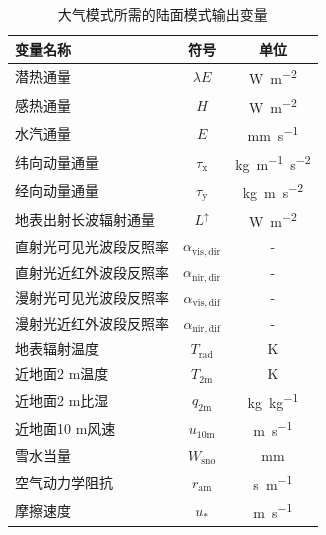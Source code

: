 {
  \begin{table}[htbp]
    \centering
    \caption{大气模式所需的陆面模式输出变量}
    \label{tab:大气模式所需的陆面模式输出变量}
    \begin{threeparttable}
      \begin{tabular}{lcc}
        \toprule
        变量名称               & 符号                        & 单位                     \\ \midrule
        潜热通量               & $\lambda E$                 & \unit{W.m^{-2}}          \\
        感热通量               & $H$                         & \unit{W.m^{-2}}          \\
        水汽通量               & $E$                         & \unit{mm.s^{-1}}         \\
        纬向动量通量           & $\tau_{\mathrm{x}}$         & \unit{kg.m^{-1}.s^{-2}}  \\
        经向动量通量           & $\tau_{\mathrm{y}}$         & \unit{kg.m.s^{-2}}       \\
        地表出射长波辐射通量   & $L ^\uparrow$               & \unit{W.m^{-2}}          \\
        直射光可见光波段反照率 & $\alpha_{\mathrm{vis,dir}}$ & -                        \\
        直射光近红外波段反照率 & $\alpha_{\mathrm{nir,dir}}$ & -                        \\
        漫射光可见光波段反照率 & $\alpha_{\mathrm{vis,dif}}$ & -                        \\
        漫射光近红外波段反照率 & $\alpha_{\mathrm{nir,dif}}$ & -                        \\
        地表辐射温度           & $T_{\mathrm{rad}}$          & K                        \\
        近地面2 m温度          & $T_{\mathrm{2m}}$           & K                        \\
        近地面2 m比湿          & $q_{\mathrm{2m}}$           & \unit{kg.kg^{-1}}        \\
        近地面10 m风速         & $u_{\mathrm{10m}}$          & \unit{m.s^{-1}}          \\
        雪水当量               & $W_{\mathrm{sno}}$          & mm                       \\
        空气动力学阻抗         & $r_{\mathrm{am}}$           & \unit{s.m^{-1}}          \\
        摩擦速度               & $u_\ast$                    & \unit{m.s^{-1}}          \\

\end{tabular}
\end{threeparttable}
\end{table}}
